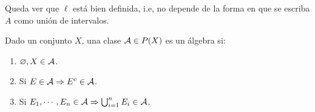 \begin{note}
    Queda ver que \(\ell\) está bien definida, i.e, no depende de la forma en que se escriba \(A\) como unión de intervalos.
\end{note}

\begin{definition}[Álgebra]
    Dado un conjunto \(X\), una clase \(\mathcal{A} \in P(X)\) es un álgebra si: \begin{enumerate}
        \item \(\varnothing, X \in \mathcal{A}\).
        \item Si \(E \in \mathcal{A} \Rightarrow E^c \in \mathcal{A}\).
        \item Si \(E_1, \cdots, E_n \in \mathcal{A} \Rightarrow \bigcup_{i = 1}^n E_i \in \mathcal{A}\).
    \end{enumerate}
\end{definition}

